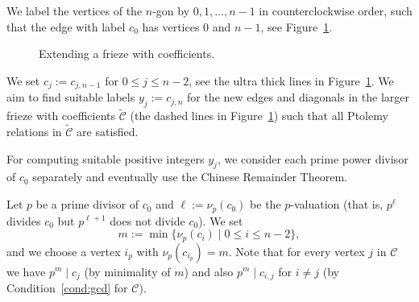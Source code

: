 \documentclass[10pt]{amsart}
\numberwithin{equation}{section}
\theoremstyle{definition}
\theoremstyle{remark}
\begin{document}

We label the vertices of the $n$-gon by $0,1,\ldots,n-1$ in counterclockwise order,
such that the edge with label $c_0$ has vertices $0$ and $n-1$, see Figure~\ref{fig:ext}. 

\begin{figure}[htb]\centering
{}
 \caption{Extending a frieze with coefficients. 
 \label{fig:ext}}
\end{figure}

We set $c_j:= c_{j,n-1}$ for $0\le j\le n-2$, see the ultra thick lines in
Figure~\ref{fig:ext}. We aim to find suitable labels $y_j:=c_{j,n}$ for the 
new edges and diagonals in the larger frieze with coefficients $\widetilde{\mathcal{C}}$
(the dashed lines in Figure~\ref{fig:ext})
such that all Ptolemy relations in $\widetilde{\mathcal{C}}$ are satisfied. 

For computing suitable positive integers $y_j$, 
we consider each prime power divisor of $c_0$ separately and eventually use the 
Chinese Remainder Theorem.

Let $p$ be a prime divisor of $c_0$ and $\ell:=\nu_p(c_0)$ be the $p$-valuation
(that is, $p^{\ell}$ divides $c_0$ but $p^{\ell+1}$ does not divide $c_0$). 
We set
\[
m:= \min \{\nu_p(c_i)\mid 0\le i\le n-2\},
\]
and we choose a vertex $i_p$ with $\nu_p(c_{i_p})=m$. Note that for every vertex $j$
in $\mathcal{C}$ we have $p^m\mid c_j$ (by minimality of $m$) and 
also $p^m\mid c_{i,j}$ for $i\ne j$ (by Condition~\eqref{cond:gcd} for $\mathcal{C}$). 
\end{document}
